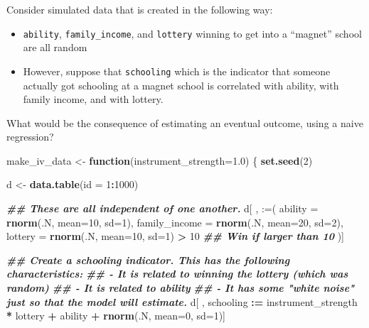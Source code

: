 \documentclass[
]{article}
\newenvironment{Shaded}{\begin{snugshade}}{\end{snugshade}}
\newcommand{\AttributeTok}[1]{\textcolor[rgb]{0.13,0.29,0.53}{#1}}
\newcommand{\ControlFlowTok}[1]{\textcolor[rgb]{0.13,0.29,0.53}{\textbf{#1}}}
\newcommand{\DecValTok}[1]{\textcolor[rgb]{0.00,0.00,0.81}{#1}}
\newcommand{\DocumentationTok}[1]{\textcolor[rgb]{0.56,0.35,0.01}{\textbf{\textit{#1}}}}
\newcommand{\FloatTok}[1]{\textcolor[rgb]{0.00,0.00,0.81}{#1}}
\newcommand{\FunctionTok}[1]{\textcolor[rgb]{0.13,0.29,0.53}{\textbf{#1}}}
\newcommand{\NormalTok}[1]{#1}
\newcommand{\OtherTok}[1]{\textcolor[rgb]{0.56,0.35,0.01}{#1}}
\newcommand{\SpecialCharTok}[1]{\textcolor[rgb]{0.81,0.36,0.00}{\textbf{#1}}}
\newcommand{\StringTok}[1]{\textcolor[rgb]{0.31,0.60,0.02}{#1}}
\providecommand{\tightlist}{%
  \setlength{\itemsep}{0pt}\setlength{\parskip}{0pt}}
\theoremstyle{definition}
\theoremstyle{definition}
\theoremstyle{definition}
\theoremstyle{definition}
\theoremstyle{remark}
\begin{document}
Consider simulated data that is created in the following way:

\begin{itemize}
\tightlist
\item
  \texttt{ability}, \texttt{family\_income}, and \texttt{lottery} winning to get into a ``magnet'' school are all random
\item
  However, suppose that \texttt{schooling} which is the indicator that someone actually got schooling at a magnet school is correlated with ability, with family income, and with lottery.
\end{itemize}

What would be the consequence of estimating an eventual outcome, using a naive regression?

\begin{Shaded}
\begin{Highlighting}[]
\NormalTok{make\_iv\_data }\OtherTok{\textless{}{-}} \ControlFlowTok{function}\NormalTok{(}\AttributeTok{instrument\_strength=}\FloatTok{1.0}\NormalTok{) \{ }
  \FunctionTok{set.seed}\NormalTok{(}\DecValTok{2}\NormalTok{)}

\NormalTok{  d }\OtherTok{\textless{}{-}} \FunctionTok{data.table}\NormalTok{(}\AttributeTok{id =} \DecValTok{1}\SpecialCharTok{:}\DecValTok{1000}\NormalTok{)}
  
  \DocumentationTok{\#\# These are all independent of one another. }
\NormalTok{  d[ , }\StringTok{\textquotesingle{}:=\textquotesingle{}}\NormalTok{(}
    \AttributeTok{ability       =} \FunctionTok{rnorm}\NormalTok{(.N, }\AttributeTok{mean=}\DecValTok{10}\NormalTok{, }\AttributeTok{sd=}\DecValTok{1}\NormalTok{), }
    \AttributeTok{family\_income =} \FunctionTok{rnorm}\NormalTok{(.N, }\AttributeTok{mean=}\DecValTok{20}\NormalTok{, }\AttributeTok{sd=}\DecValTok{2}\NormalTok{), }
    \AttributeTok{lottery       =} \FunctionTok{rnorm}\NormalTok{(.N, }\AttributeTok{mean=}\DecValTok{10}\NormalTok{, }\AttributeTok{sd=}\DecValTok{1}\NormalTok{) }\SpecialCharTok{\textgreater{}} \DecValTok{10} \DocumentationTok{\#\# Win if larger than 10}
\NormalTok{    )]}
  
  \DocumentationTok{\#\# Create a schooling indicator. This has the following characteristics: }
  \DocumentationTok{\#\#   {-} It is related to winning the lottery (which was random) }
  \DocumentationTok{\#\#   {-} It is related to ability}
  \DocumentationTok{\#\#   {-} It has some "white noise" just so that the model will estimate. }
\NormalTok{  d[ , schooling }\SpecialCharTok{:=}\NormalTok{ instrument\_strength }\SpecialCharTok{*}\NormalTok{ lottery }\SpecialCharTok{+}\NormalTok{ ability }\SpecialCharTok{+} \FunctionTok{rnorm}\NormalTok{(.N, }\AttributeTok{mean=}\DecValTok{0}\NormalTok{, }\AttributeTok{sd=}\DecValTok{1}\NormalTok{)]}
  

\end{Highlighting}
\end{Shaded}
\end{document}

